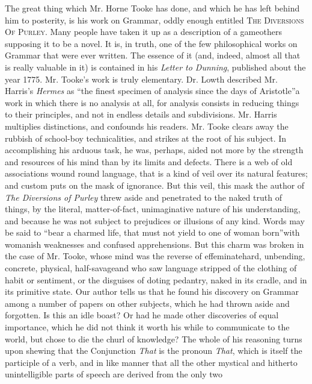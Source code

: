 The great thing which Mr. Horne Tooke has done, and which he has
left behind him to posterity, is his work on Grammar, oddly enough
entitled \textsc{The Diversions Of Purley}. Many people have taken it up as
a description of a game\textemdash others supposing it to be a novel. It is,
in truth, one of the few philosophical works on Grammar that were
ever written. The essence of it (and, indeed, almost all that is
really valuable in it) is contained in his \emph{Letter to Dunning},
published about the year 1775.  Mr. Tooke's work is truly
elementary. Dr. Lowth described Mr. Harris's \emph{Hermes} as ``the
finest specimen of analysis since the days of Aristotle''\textemdash a work
in which there is no analysis at all, for analysis consists in
reducing things to their principles, and not in endless details
and subdivisions. Mr. Harris multiplies distinctions, and
confounds his readers. Mr. Tooke clears away the rubbish of
school-boy technicalities, and strikes at the root of his
subject. In accomplishing his arduous task, he was, perhaps, aided
not more by the strength and resources of his mind than by its
limits and defects. There is a web of old associations wound round
language, that is a kind of veil over its natural features; and
custom puts on the mask of ignorance. But this veil, this mask the
author of \emph{The Diversions of Purley} threw aside and penetrated to
the naked truth of things, by the literal, matter-of-fact,
unimaginative nature of his understanding, and because he was not
subject to prejudices or illusions of any kind. Words may be said
to ``bear a charmed life, that must not yield to one of woman
born''\textemdash with womanish weaknesses and confused apprehensions. But
this charm was broken in the case of Mr. Tooke, whose mind was the
reverse of effeminate\textemdash hard, unbending, concrete, physical,
half-savage\textemdash and who saw language stripped of the clothing of
habit or sentiment, or the disguises of doting pedantry, naked in
its cradle, and in its primitive state. Our author tells us that
he found his discovery on Grammar among a number of papers on
other subjects, which he had thrown aside and forgotten. Is this
an idle boast? Or had he made other discoveries of equal
importance, which he did not think it worth his while to
communicate to the world, but chose to die the churl of knowledge?
The whole of his reasoning turns upon shewing that the Conjunction
\emph{That} is the pronoun \emph{That}, which is itself the participle of a
verb, and in like manner that all the other mystical and hitherto
unintelligible parts of speech are derived from the only two
